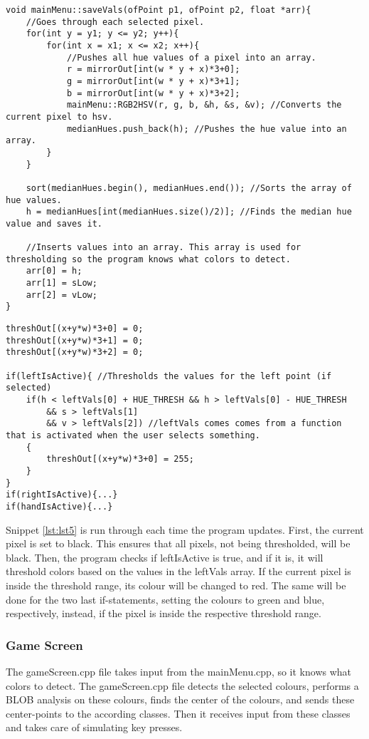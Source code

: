 \pagebreak[4]
\begin{lstlisting}[caption=saveVals function, label=lst:lst4]
void mainMenu::saveVals(ofPoint p1, ofPoint p2, float *arr){
    //Goes through each selected pixel.
    for(int y = y1; y <= y2; y++){
        for(int x = x1; x <= x2; x++){
            //Pushes all hue values of a pixel into an array.
            r = mirrorOut[int(w * y + x)*3+0];
            g = mirrorOut[int(w * y + x)*3+1];
            b = mirrorOut[int(w * y + x)*3+2];
            mainMenu::RGB2HSV(r, g, b, &h, &s, &v); //Converts the current pixel to hsv.
            medianHues.push_back(h); //Pushes the hue value into an array.
        }
    }

    sort(medianHues.begin(), medianHues.end()); //Sorts the array of hue values.
    h = medianHues[int(medianHues.size()/2)]; //Finds the median hue value and saves it.

    //Inserts values into an array. This array is used for thresholding so the program knows what colors to detect.
    arr[0] = h;
    arr[1] = sLow;
    arr[2] = vLow;
}
\end{lstlisting}

\begin{lstlisting}[caption=Thresholding, label=lst:lst5]
threshOut[(x+y*w)*3+0] = 0;
threshOut[(x+y*w)*3+1] = 0;
threshOut[(x+y*w)*3+2] = 0;

if(leftIsActive){ //Thresholds the values for the left point (if selected)
    if(h < leftVals[0] + HUE_THRESH && h > leftVals[0] - HUE_THRESH
        && s > leftVals[1]
        && v > leftVals[2]) //leftVals comes comes from a function that is activated when the user selects something.
    {
        threshOut[(x+y*w)*3+0] = 255;
    }
}
if(rightIsActive){...}
if(handIsActive){...}
\end{lstlisting}

Snippet \ref{lst:lst5} is run through each time the program updates. 
First, the current pixel is set to black. 
This ensures that all pixels, not being thresholded, will be black. 
Then, the program checks if leftIsActive is true, and if it is, it will threshold colors based on the values in the leftVals array. 
If the current pixel is inside the threshold range, its colour will be changed to red. 
The same will be done for the two last if-statements, setting the colours to green and blue, respectively, instead, if the pixel is inside the respective threshold range.


\subsubsection*{Game Screen}
The gameScreen.cpp file takes input from the mainMenu.cpp, so it knows what colors to detect. 
The gameScreen.cpp file detects the selected colours, performs a BLOB analysis on these colours, finds the center of the colours, and sends these center-points to the according classes. 
Then it receives input from these classes and takes care of simulating key presses.
\bigskip

